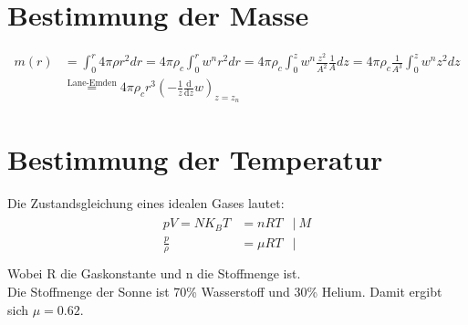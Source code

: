 \documentclass[a4paper,10pt]{article}
\newcommand{\Diff}[1]{\frac{\text{d}}{\text{d} #1}}
\newcounter{ale}
\begin{document}
\section{Bestimmung der Masse}
\begin{align*}
 m(r) &= \int_0^r 4 \pi \rho r^2 dr = 4 \pi \rho_c \int_0^r w^n r^2 dr
      = 4 \pi \rho_c \int_0^z w^n \frac{z^2}{A^2} \frac 1 A dz
      = 4 \pi \rho_c \frac{1}{A^3} \int_0^z w^n z^2 dz \\
&\stackrel{\text{Lane-Emden}}{=} 4 \pi \rho_c r^3
  \left(- \frac{1}{z} \Diff{z}{w} \right)_{z = z_n}
\end{align*}
\section{Bestimmung der Temperatur}
Die Zustandsgleichung eines idealen Gases lautet:
\begin{align*}
\begin{array}{rrl}
  p V = N K_B T &= n R T & \left | \ M \right . \\
  \frac p \rho &= \mu R T & \left | \right . \\  
\end{array}
\end{align*}
Wobei R die Gaskonstante und n die Stoffmenge ist.\\
Die Stoffmenge der Sonne ist 70\% Wasserstoff und 30\% Helium.
Damit ergibt sich $\mu = 0.62$.
\end{document}
